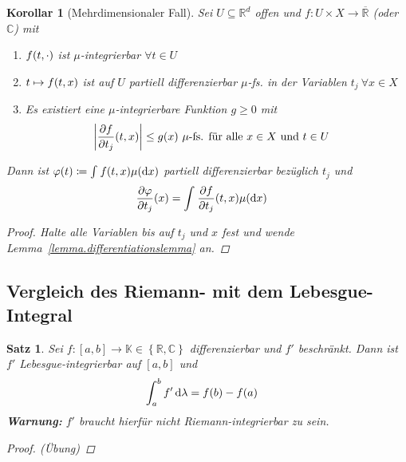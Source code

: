 \documentclass[11pt, twoside, a4paper]{article}
\theoremstyle{plain}
\newtheorem{satz}[blockelement]{Satz}
\newtheorem{korollar}[blockelement]{Korollar}
\numberwithin{equation}{subsection}
\newcommand{\set}[1]{\left\{#1\right\}}
\newcommand{\of}[1]{\mathopen{}\mathclose{}\bgroup\left(#1\aftergroup\egroup\right)}
\newcommand{\abs}[1]{\left\lvert#1\right\rvert}
\newcommand{\interv}[1]{\left[#1\right]}
\newcommand{\dif}{\mathop{}\!\mathrm{d}}
\newcommand{\R}{\mathbb{R}}
\newcommand{\C}{\mathbb{C}}
\newcommand{\K}{\mathbb{K}}
\begin{document}
    \begin{korollar}[Mehrdimensionaler Fall] %
        Sei $U\subseteq\R^d$ offen und $f: U \times X \to \overline{\R}$ (oder $\C$) mit
        \begin{enumerate}[label=(\roman*)]
            \item $f\of{t, \cdot}$ ist $\mu$-integrierbar $\forall t\in U$
            \item $t\mapsto f\of{t, x}$ ist auf $U$ partiell differenzierbar $\mu$-fs. in der Variablen $t_j~\forall x\in X$
            \item Es existiert eine $\mu$-integrierbare Funktion $g\geq 0$ mit
            \begin{align*}
                \abs{ \frac{\partial f}{\partial t_j}\of{t, x}} &\leq g\of{x}\text{ $\mu$-fs. für alle $x\in X$ und $t\in U$}
            \end{align*}
        \end{enumerate}
        Dann ist $\varphi\of{t}\coloneqq \int_{}^{} f\of{t, x} \mu\of{\dif x}$ partiell differenzierbar bezüglich $t_j$ und
        \begin{align*}
            \frac{\partial \varphi}{\partial t_j}\of{x} &= \int_{}^{} \frac{\partial f}{\partial t_j}\of{t, x} \mu\of{\dif x}
        \end{align*}
        \begin{proof}
            Halte alle Variablen bis auf $t_j$ und $x$ fest und wende Lemma~\ref{lemma.differentiationslemma} an.
        \end{proof}
    \end{korollar}

    \subsection{Vergleich des Riemann- mit dem Lebesgue-Integral}

    \begin{satz} %
        Sei $f: \interv{a,b} \to \K\in\set{\R, \C}$ differenzierbar und $f'$ beschränkt. Dann ist $f'$ Lebesgue-integrierbar auf $\interv{a,b}$ und
        \begin{align*}
            \int_{a}^{b} f' \dif \lambda &= f\of{b} - f\of{a}
        \end{align*}
        \textbf{Warnung:} $f'$ braucht hierfür nicht Riemann-integrierbar zu sein.

        \begin{proof}
            \marginnote{[20. Jan]}
            (Übung)
        \end{proof}
    \end{satz}
\end{document}
